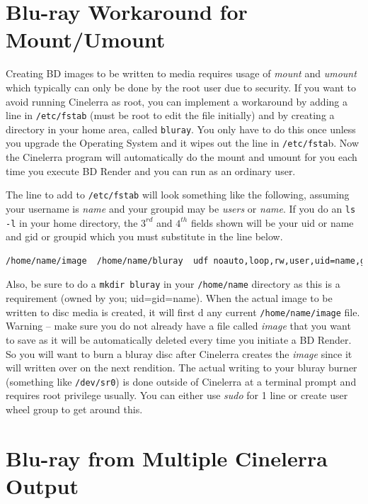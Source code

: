 \section{Blu-ray Workaround for Mount/Umount}%
\label{sec:bluray_workaround_mount_umount}

Creating BD images to be written to media requires usage of \textit{mount} and \textit{umount} which typically can only be done by the root user due to security.  If you want to avoid running Cinelerra as root, you can implement a workaround by adding a line in \texttt{/etc/fstab} (must be root to edit the file initially) and by creating a directory in your home area, called \texttt{bluray}.  You only have to do this once unless you upgrade the Operating System and it wipes out the line in \texttt{/etc/fsta}b.  Now the Cinelerra program will automatically do the mount and umount for you each time you execute BD Render and you can run as an ordinary user.

The line to add to \texttt{/etc/fstab} will look something like the following, assuming your username is \textit{name} and your groupid may be \textit{users} or \textit{name}.  If you do an \texttt{ls -l} in your home directory, the $3^{rd}$ and $4^{th}$ fields shown will be your uid or name and gid or groupid which you must substitute in the line below.

\begin{lstlisting}[language=bash,numbers=none]
/home/name/image  /home/name/bluray  udf noauto,loop,rw,user,uid=name,gid=groupid 0 0
\end{lstlisting}

Also, be sure to do a \texttt{mkdir bluray} in your \texttt{/home/name} directory as this is a requirement (owned by you; uid=gid=name).  When the actual image to be written to disc media is created, it will first d any current \texttt{/home/name/image} file.  Warning – make sure you do not already have a file called \textit{image} that you want to save as it will be automatically deleted every time you initiate a BD Render.  So you will want to burn a bluray disc after Cinelerra creates the \textit{image} since it will written over on the next rendition.  The actual writing to your bluray burner (something like \texttt{/dev/sr0}) is done outside of Cinelerra at a terminal prompt and requires root privilege usually.  You can either use \textit{sudo} for 1 line or create user wheel group to get around this.

\section{Blu-ray from Multiple Cinelerra Output}%
\label{sec:bluray_multiple_cinelerra_output}

